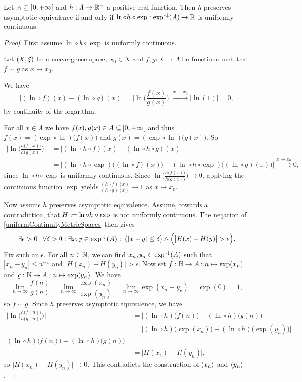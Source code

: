 \begin{proposition}
Let $A\subseteq \interval[o]{0,+\infty}$ and $h: A\to \mathbb{R}^+$ a positive real function. Then $h$ preserves asymptotic equivalence \textup{if and only if} $\ln\circ h\circ \exp: \exp^{{\text{\hspace{0.15em}-}\downarrow}}(A) \to \mathbb{R}$ is uniformly continuous.
\end{proposition}
\begin{proof}
First assume $\ln\circ h\circ \exp$ is uniformly continuous.

Let $\sSet{X,\xi}$ be a convergence space, $x_0\in X$ and $f,g: X\to A$ be functions such that $f\sim g$ as $x\to x_0$.

We have
\[ \big|(\ln \circ f)(x) - (\ln \circ g)(x)\big| = \Big|\ln\Big(\frac{f(x)}{g(x)}\Big)\Big| \overset{x\to x_0}{\longrightarrow} |\ln(1)| = 0, \]
by continuity of the logarithm.

For all $x\in A$ we have $f(x), g(x)\in A \subseteq \interval[o]{0,+\infty}$ and thus $f(x) = (\exp\circ \ln)\big(f(x)\big)$ and $g(x) = (\exp\circ \ln)\big(g(x)\big)$. So
\begin{align*}
\Big|\ln\Big(\frac{h\big(f(x)\big)}{h\big(g(x)\big)}\Big)\Big| &= \big|(\ln\circ h \circ f)(x) - (\ln\circ h \circ g)(x)\big| \\
&= \big|(\ln\circ h \circ \exp)\big((\ln\circ f)(x)\big) - (\ln\circ h \circ \exp)\big((\ln\circ g)(x)\big)\big| \overset{x\to x_0}{\longrightarrow} 0,
\end{align*}
since $\ln\circ h \circ \exp$ is uniformly continuous. Since $\ln\Big(\frac{h\big(f(x)\big)}{h\big(g(x)\big)}\Big) \to 0$, applying the continuous function $\exp$ yields $\frac{(h\circ f)(x)}{(h\circ g)(x)} \to 1$ as $x\to x_0$.

Now assume $h$ preserves asymptotic equivalence. Assume, towards a contradiction, that $H \coloneqq \ln\circ h\circ \exp$ is not uniformly continuous. The negation of \ref{uniformContinuityMetricSpaces} then gives
\[ \exists \epsilon >0: \forall \delta > 0: \exists x,y\in \exp^{{\text{\hspace{0.15em}-}\downarrow}}(A): \; \big(|x-y| \leq \delta\big) \land \Big(\big|H(x) - H(y)\big| > \epsilon\Big). \]
Fix such an $\epsilon$. For all $n\in \mathbb{N}$, we can find $x_n,y_n \in \exp^{{\text{\hspace{0.15em}-}\downarrow}}(A)$ such that $|x_n - y_n| \leq n^{-1}$ and $\big|H(x_n) - H(y_n)\big| > \epsilon$. Now set $f: \mathbb{N}\to A: n\mapsto \exp(x_n)$ and $g: \mathbb{N}\to A: n\mapsto \exp(y_n)$. We have
\[ \lim_{n\to \infty} \frac{f(n)}{g(n)} = \lim_{n\to \infty} \frac{\exp(x_n)}{\exp(y_n)} = \lim_{n\to \infty}\exp(x_n - y_n) = \exp(0) = 1, \]
so $f\sim g$. Since $h$ preserves asymptotic equivalence, we have
\begin{align*}
\Big|\ln\Big(\frac{h\big(f(n))}{h\big(g(n))}\Big)\Big| &= \big|(\ln\circ h)\big(f(n)\big) - (\ln\circ h)\big(g(n)\big)\big| \\
&= \big|(\ln\circ h)\big(\exp(x_n)\big) - (\ln\circ h)\big(\exp(y_n)\big)\big| \\
(\ln\circ h)\big(f(n)\big) - (\ln\circ h)\big(g(n)\big)\big| \\
&= \big|H(x_n) - H(y_n)\big|,
\end{align*}
so $\big|H(x_n) - H(y_n)\big| \to 0$. This contradicts the construction of $\left\langle x_n \right\rangle$ and $\left\langle y_n \right\rangle$.
\end{proof}
